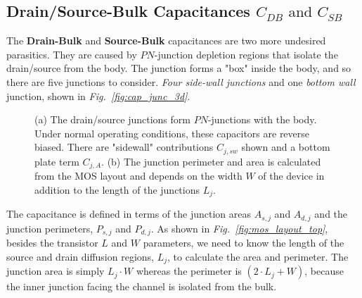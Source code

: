 \subsection{Drain/Source-Bulk Capacitances \texorpdfstring{$C_{DB}\text{ and }C_{SB}$}{}}
The \textbf{Drain-Bulk} and \textbf{Source-Bulk} capacitances are two more undesired parasitics.  They are caused by $PN$-junction depletion regions that isolate the drain/source from the body. The junction forms a "box" inside the body, and so there are five junctions to consider. \textit{Four side-wall junctions} and one \textit{bottom wall} junction, shown in \emph{Fig.~\ref{fig:cap_junc_3d}}.
\begin{figure}[H]
\centering
{}
\hspace{0.75cm}
\caption{(a) The drain/source junctions form $PN$-junctions with the body.  Under normal operating conditions, these capacitors are reverse biased.  There are "sidewall" contributions $C_{j,sw}$ shown and a bottom plate term $C_{j,A}$.  (b)  The junction perimeter and area is calculated from the MOS layout and depends on the width $W$ of the device in addition to the length of the junctions $L_j$.} 
\end{figure}
\newpage
The capacitance is defined in terms of the junction areas $A_{s,j}$ and $A_{d,j}$ and the junction perimeters, $P_{s,j}$ and $P_{d,j}$.  As shown in  \emph{Fig.~\ref{fig:mos_layout_top}}, besides the transistor $L$ and $W$ parameters, we need to know the length of the source and drain diffusion regions, $L_j$, to calculate the area and perimeter.  The junction area is simply $L_j \cdot W$ whereas the perimeter is $(2\cdot L_j + W)$, because the inner junction facing the channel is isolated from the bulk.
